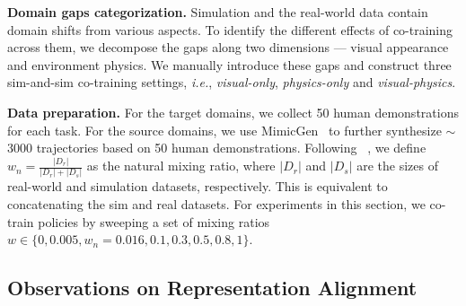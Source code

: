 \textbf{Domain gaps categorization.} Simulation and the real-world data contain domain shifts from various aspects.
To identify the different effects of co-training across them, we decompose the gaps along two dimensions — visual appearance and environment physics. We manually introduce these gaps and construct three sim-and-sim co-training settings, \textit{i.e.}, \textit{visual-only}, \textit{physics-only} and \textit{visual-physics}.




\textbf{Data preparation.}
For the target domains, we collect 50 human demonstrations for each task.
For the source domains, we use MimicGen~\cite{mandlekar2023mimicgen} to further synthesize $\sim$3000 trajectories based on 50 human demonstrations.
Following ~\citet{wei2025empirical}, we define $w_n=\frac{|D_r|}{|D_r|+|D_s|}$ as the natural mixing ratio, where $|D_r|$ and $|D_s|$ are the sizes of real-world and simulation datasets, respectively. This is equivalent to concatenating the sim and real datasets.
For experiments in this section, we co-train policies by sweeping a set of mixing ratios $w\in \{ 0, 0.005, w_n=0.016, 0.1, 0.3, 0.5, 0.8, 1\}$.

\subsection{Observations on Representation Alignment}
\label{sec: representation alignment}

